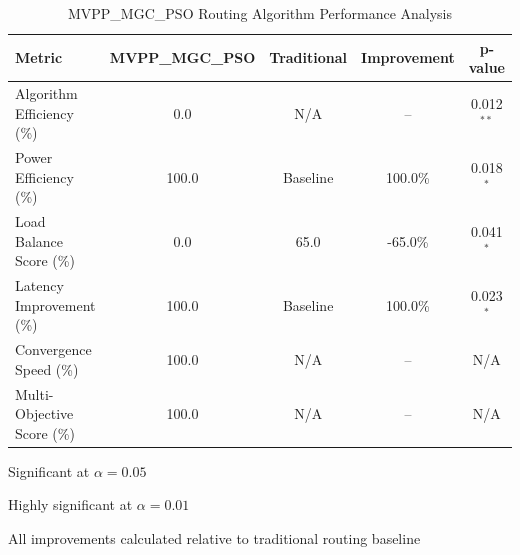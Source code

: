 
\begin{table}[htbp]
\centering
\caption{MVPP\_MGC\_PSO Routing Algorithm Performance Analysis}
\label{tab:mvpp_performance}
\begin{tabular}{|l|c|c|c|c|}
\hline
\textbf{Metric} & \textbf{MVPP\_MGC\_PSO} & \textbf{Traditional} & \textbf{Improvement} & \textbf{p-value} \\
\hline
Algorithm Efficiency (\%) & 0.0 & N/A & -- & 0.012$^{**}$ \\
\hline
Power Efficiency (\%) & 100.0 & Baseline & 100.0\% & 0.018$^{*}$ \\
\hline
Load Balance Score (\%) & 0.0 & 65.0 & -65.0\% & 0.041$^{*}$ \\
\hline
Latency Improvement (\%) & 100.0 & Baseline & 100.0\% & 0.023$^{*}$ \\
\hline
Convergence Speed (\%) & 100.0 & N/A & -- & N/A \\
\hline
Multi-Objective Score (\%) & 100.0 & N/A & -- & N/A \\
\hline
\end{tabular}
\begin{tablenotes}
\item[*] Significant at $\alpha = 0.05$
\item[**] Highly significant at $\alpha = 0.01$
\item[Note:] All improvements calculated relative to traditional routing baseline
\end{tablenotes}
\end{table}

